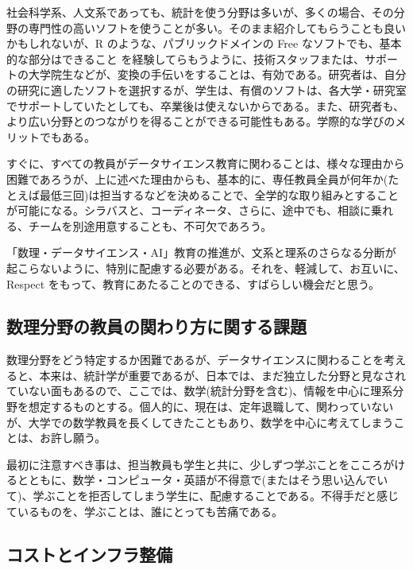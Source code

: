 \documentclass[
]{book}
\theoremstyle{definition}
\theoremstyle{definition}
\theoremstyle{definition}
\theoremstyle{definition}
\theoremstyle{remark}
\begin{document}
社会科学系、人文系であっても、統計を使う分野は多いが、多くの場合、その分野の専門性の高いソフトを使うことが多い。そのまま紹介してもらうことも良いかもしれないが、R のような、パブリックドメインの Free なソフトでも、基本的な部分はできること を経験してらもうように、技術スタッフまたは、サポートの大学院生などが、変換の手伝いをすることは、有効である。研究者は、自分の研究に適したソフトを選択するが、学生は、有償のソフトは、各大学・研究室でサポートしていたとしても、卒業後は使えないからである。また、研究者も、より広い分野とのつながりを得ることができる可能性もある。学際的な学びのメリットでもある。

すぐに、すべての教員がデータサイエンス教育に関わることは、様々な理由から困難であろうが、上に述べた理由からも、基本的に、専任教員全員が何年か(たとえば最低三回)は担当するなどを決めることで、全学的な取り組みとすることが可能になる。シラバスと、コーディネータ、さらに、途中でも、相談に乗れる、チームを別途用意することも、不可欠であろう。

「数理・データサイエンス・AI」教育の推進が、文系と理系のさらなる分断が起こらないように、特別に配慮する必要がある。それを、軽減して、お互いに、Respect をもって、教育にあたることのできる、すばらしい機会だと思う。

\hypertarget{ux6570ux7406ux5206ux91ceux306eux6559ux54e1ux306eux95a2ux308fux308aux65b9ux306bux95a2ux3059ux308bux8ab2ux984c}{%
\subsection{数理分野の教員の関わり方に関する課題}\label{ux6570ux7406ux5206ux91ceux306eux6559ux54e1ux306eux95a2ux308fux308aux65b9ux306bux95a2ux3059ux308bux8ab2ux984c}}

数理分野をどう特定するか困難であるが、データサイエンスに関わることを考えると、本来は、統計学が重要であるが、日本では、まだ独立した分野と見なされていない面もあるので、ここでは、数学(統計分野を含む)、情報を中心に理系分野を想定するものとする。個人的に、現在は、定年退職して、関わっていないが、大学での数学教員を長くしてきたこともあり、数学を中心に考えてしまうことは、お許し願う。

最初に注意すべき事は、担当教員も学生と共に、少しずつ学ぶことをこころがけるとともに、数学・コンピュータ・英語が不得意で(またはそう思い込んでいて)、学ぶことを拒否してしまう学生に、配慮することである。不得手だと感じているものを、学ぶことは、誰にとっても苦痛である。

\hypertarget{ux30b3ux30b9ux30c8ux3068ux30a4ux30f3ux30d5ux30e9ux6574ux5099}{%
\subsection{コストとインフラ整備}\label{ux30b3ux30b9ux30c8ux3068ux30a4ux30f3ux30d5ux30e9ux6574ux5099}}
\end{document}
